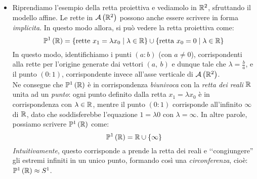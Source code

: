 \begin{examples}
\begin{itemize}
\begin{enumerate}
	\end{enumerate}
	\item Riprendiamo l'esempio della retta proiettiva e vediamolo in $\mathbb{R}^2$, sfruttando il modello affine. Le rette in $\mathcal{A}\left(\mathbb{R}^2\right)$ possono anche essere scrivere in forma \textit{implicita}. In questo modo allora, si può vedere la retta proiettiva come:
	\begin{equation*}
		\proj[1]{\realset}=\left\{\text{rette } x_1=\lambda x_0\mid \lambda\in\realset\right\}\cup \left\{\text{retta } x_0=0\mid \lambda\in\realset\right\}
	\end{equation*}
	In questo modo, identifichiamo i punti $\left(a\colon b\right)$ (con $a\neq 0$), corrispondenti alla rette per l'origine generate dai vettori $\left(a,\ b\right)$ e dunque tale che $\lambda=\frac{b}{a}$, e il punto $\left(0\colon 1\right)$, corrispondente invece all'asse verticale di $\mathcal{A}\left(\mathbb{R}^2\right)$.\\ Ne consegue che $\proj[1]{\realset}$ è in corrispondenza \textit{biunivoca} con la \textit{retta dei reali} $\mathbb{R}$ unita ad un \textit{punto}: ogni punto definito dalla retta $x_1=\lambda x_0$ è in corrispondenza con $\lambda\in\mathbb{R}$, mentre il punto $\left(0\colon 1\right)$ corrisponde all'infinito $\infty$ di $\mathbb{R}$, dato che soddisferebbe l'equazione $1=\lambda 0$ con $\lambda=\infty$. In altre parole, possiamo scrivere $\proj[1]{\realset}$ come:
	\begin{equation*}
		\proj[1]{\realset}=\realset\cup\left\{\infty\right\}
	\end{equation*}
    \textit{Intuitivamente}, questo corrisponde a prende la retta dei reali e ‘‘congiungere'' gli estremi infiniti in un unico punto, formando così una \textit{circonferenza}, cioè: $\proj[1]{\realset}\approx S^1$.
	\end{itemize}
\end{examples}
